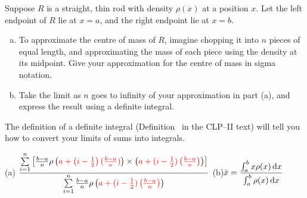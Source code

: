 \begin{Mquestion}\label{prob_s2.3:rod}
Suppose  $R$ is a straight, thin rod with density $\rho(x)$ at a position $x$. Let the left endpoint of $R$ lie at $x=a$, and the right endpoint lie at $x=b$.

\begin{enumerate}[(a)]
\item To approximate the centre of mass of $R$, imagine chopping it into $n$ pieces of equal length, and approximating the mass of each piece using the density at its midpoint.  Give your approximation for the centre of mass in sigma notation.
\begin{center}
\end{center}
\item \label{prob_s2.3:rodb}Take the limit as $n$ goes to infinity of your approximation in part (a), and express the result using a definite integral.
\end{enumerate}
\end{Mquestion}
\begin{hint}
The definition of a definite integral (Definition~ in the CLP--II text) will tell you how to convert your limits of sums into integrals.
\end{hint}
\begin{answer}
(a) \quad$\displaystyle\frac{\sum\limits_{i=1}^n\left[\frac{b-a}{n}\rho\left(\textcolor{red}{a+\left(i-\tfrac12\right)(\tfrac{b-a}{n})}\right)\times\left(
\textcolor{red}{
a+(i-\tfrac12)\left(\tfrac{b-a}{n}\right)
}
\right)\right]}{\sum\limits_{i=1}^n\frac{b-a}{n}\rho\left(\textcolor{red}{
a+(i-\tfrac12)\left(\tfrac{b-a}{n}\right)
}
\right)}$\qquad
(b)\quad $\displaystyle\bar x=\frac{\int_a^b x\rho(x)\,\mathrm{d}x}{\int_a^b\rho(x)\,\mathrm{d}x}$
\end{answer}
